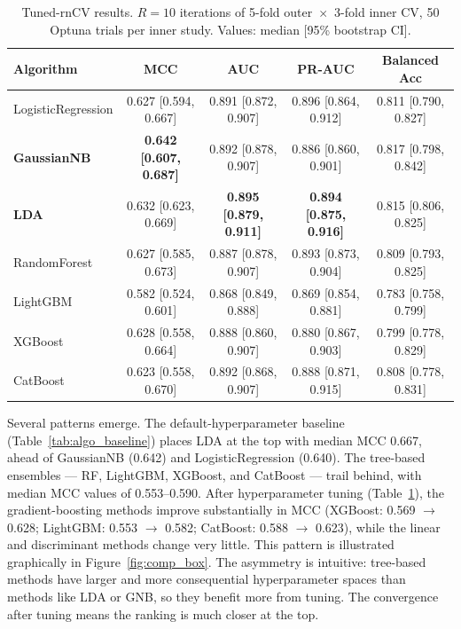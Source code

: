 \begin{table}[t]
    \centering
    \small
    \caption{Tuned-rnCV results. $R = 10$ iterations of 5-fold outer~$\times$~3-fold inner CV, 50 Optuna trials per inner study. Values: median [95\% bootstrap CI].}
    \label{tab:algo_tuned}
    \begin{tabular}{lcccc}
        \toprule
        \textbf{Algorithm} & \textbf{MCC} & \textbf{AUC} & \textbf{PR-AUC} & \textbf{Balanced Acc} \\
        \midrule
        LogisticRegression & 0.627 [0.594, 0.667] & 0.891 [0.872, 0.907] & 0.896 [0.864, 0.912] & 0.811 [0.790, 0.827] \\
        \textbf{GaussianNB} & \textbf{0.642 [0.607, 0.687]} & 0.892 [0.878, 0.907] & 0.886 [0.860, 0.901] & 0.817 [0.798, 0.842] \\
        \textbf{LDA}       & 0.632 [0.623, 0.669] & \textbf{0.895 [0.879, 0.911]} & \textbf{0.894 [0.875, 0.916]} & 0.815 [0.806, 0.825] \\
        RandomForest       & 0.627 [0.585, 0.673] & 0.887 [0.878, 0.907] & 0.893 [0.873, 0.904] & 0.809 [0.793, 0.825] \\
        LightGBM           & 0.582 [0.524, 0.601] & 0.868 [0.849, 0.888] & 0.869 [0.854, 0.881] & 0.783 [0.758, 0.799] \\
        XGBoost            & 0.628 [0.558, 0.664] & 0.888 [0.860, 0.907] & 0.880 [0.867, 0.903] & 0.799 [0.778, 0.829] \\
        CatBoost           & 0.623 [0.558, 0.670] & 0.892 [0.868, 0.907] & 0.888 [0.871, 0.915] & 0.808 [0.778, 0.831] \\
        \bottomrule
    \end{tabular}
\end{table}

Several patterns emerge. The default-hyperparameter baseline (Table~\ref{tab:algo_baseline}) places LDA at the top with median MCC 0.667, ahead of GaussianNB (0.642) and LogisticRegression (0.640). The tree-based ensembles --- RF, LightGBM, XGBoost, and CatBoost --- trail behind, with median MCC values of 0.553--0.590. After hyperparameter tuning (Table~\ref{tab:algo_tuned}), the gradient-boosting methods improve substantially in MCC (XGBoost: 0.569 $\to$ 0.628; LightGBM: 0.553 $\to$ 0.582; CatBoost: 0.588 $\to$ 0.623), while the linear and discriminant methods change very little. This pattern is illustrated graphically in Figure~\ref{fig:comp_box}. The asymmetry is intuitive: tree-based methods have larger and more consequential hyperparameter spaces than methods like LDA or GNB, so they benefit more from tuning. The convergence after tuning means the ranking is much closer at the top.

